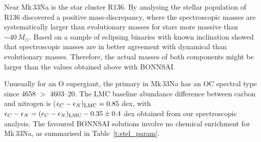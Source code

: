 \documentclass[fleqn,usenatbib]{mnras}
\begin{document}
Near Mk\,33Na is the star cluster R136. By analysing the stellar population of R136 \cite{bestenlehner2020b} discovered a positive mass-discrepancy, where the spectroscopic masses are systematically larger than evolutionary masses for stars more massive than $\sim 40\,M_{\odot}$. Based on a sample of eclipsing binaries with known inclination \cite{mahy2020} showed that spectroscopic masses are in better agreement with dynamical than evolutionary masses. Therefore, the actual masses of both components might be larger than the values obtained above with BONNSAI. 

Unusually for an O supergiant, the primary in Mk\,33Na has an OC spectral type since  4658 $>$  4603--20. The LMC baseline abundance difference between carbon and nitrogen is ($\epsilon_{C} - \epsilon_{N})_{\rm LMC} = 0.85$ dex, with $\epsilon_{C} - \epsilon_{N} = (\epsilon_{C} - \epsilon_{N})_{\rm LMC} - 0.35 \pm 0.4$ dex obtained from our spectroscopic analysis. The favoured BONNSAI solutions involve no chemical enrichment for Mk\,33Na, as summarised in Table~\ref{t:stel_param}.
\end{document}
